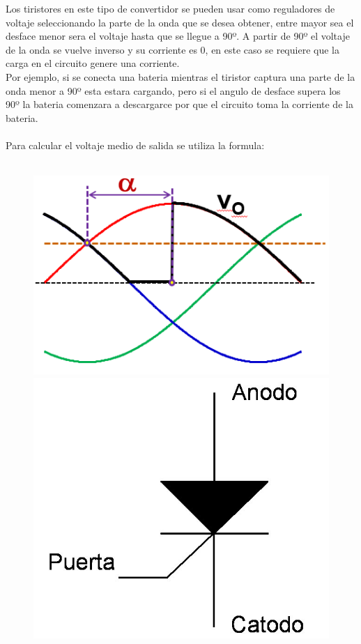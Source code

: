 \documentclass[letterpaper]{article}
\begin{document}
\begin{large}
\begin{large}
            Los tiristores en este tipo de convertidor se pueden usar como reguladores de voltaje seleccionando la parte de la onda que se desea obtener, entre mayor sea el desface menor sera el voltaje hasta que se llegue a 90º. A partir de 90º el voltaje de la onda se vuelve inverso y su corriente es 0, en este caso se requiere que la carga en el circuito genere una corriente.\\
            Por ejemplo, si se conecta una bateria mientras el tiristor captura una parte de la onda menor a 90º esta estara cargando, pero si el angulo de desface supera los 90º la bateria comenzara a descargarce por que el circuito toma la corriente de la bateria.\\\\
            Para calcular el voltaje medio de salida se utiliza la formula:\\\\
                \begin{figure}[htbp]
                    \includegraphics[scale=0.5]{IMG/ond1.png}
                    \includegraphics[scale=0.3]{IMG/tiri.jpg}

\end{figure}
\end{large}
\end{large}
\end{document}
